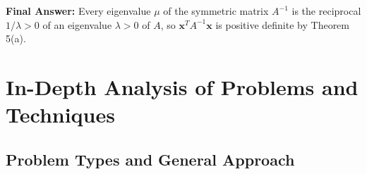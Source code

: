 \documentclass[11pt, letterpaper]{article}
\theoremstyle{definition}
\theoremstyle{remark}
\begin{document}
\textbf{Final Answer:} Every eigenvalue $\mu$ of the symmetric matrix $A^{-1}$ is the reciprocal $1/\lambda > 0$ of an eigenvalue $\lambda > 0$ of $A$, so $\mathbf{x}^T A^{-1} \mathbf{x}$ is positive definite by Theorem 5(a).

\newpage

\section{In-Depth Analysis of Problems and Techniques}

\subsection{Problem Types and General Approach}
\end{document}
